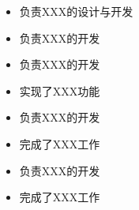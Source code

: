 \documentclass[10pt,a4paper]{xresume}
\begin{document}
\begin{minipage}[t]{0.66\textwidth}


  \begin{itemize}
  \item 负责XXX的设计与开发
  \item 负责XXX的开发
  \end{itemize}

  \divider{}

  \begin{itemize}
  \item 负责XXX的开发
  \item 实现了XXX功能
  \end{itemize}

  \divider{}

  \begin{itemize}
  \item 负责XXX的开发
  \item 完成了XXX工作
  \end{itemize}

  \divider{}

  \begin{itemize}
  \item 负责XXX的开发
  \item 完成了XXX工作
  \end{itemize}


\end{minipage}
\end{document}
